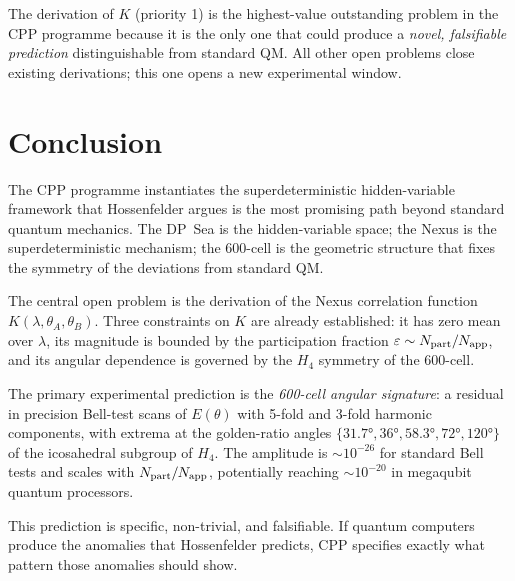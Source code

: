 \documentclass[11pt,a4paper]{article}
\newcommand{\eps}{\varepsilon}
\begin{document}
The derivation of $K$ (priority 1) is the highest-value outstanding
problem in the CPP programme because it is the only one that could
produce a \emph{novel, falsifiable prediction} distinguishable from
standard QM.  All other open problems close existing derivations;
this one opens a new experimental window.

\section{Conclusion}

The CPP programme instantiates the superdeterministic hidden-variable
framework that Hossenfelder \citep{hossenfelder2024} argues is the
most promising path beyond standard quantum mechanics.  The DP~Sea
is the hidden-variable space; the Nexus is the superdeterministic
mechanism; the 600-cell is the geometric structure that fixes the
symmetry of the deviations from standard QM.

The central open problem is the derivation of the Nexus correlation
function $K(\lambda, \theta_A, \theta_B)$.  Three constraints on $K$
are already established: it has zero mean over $\lambda$, its
magnitude is bounded by the participation fraction
$\eps \sim N_{\rm part}/N_{\rm app}$, and its angular dependence is
governed by the $H_4$ symmetry of the 600-cell.

The primary experimental prediction is the \emph{600-cell angular
signature}: a residual in precision Bell-test scans of $E(\theta)$
with 5-fold and 3-fold harmonic components, with extrema at the
golden-ratio angles $\{31.7°, 36°, 58.3°, 72°, 120°\}$ of the
icosahedral subgroup of $H_4$.  The amplitude is $\sim 10^{-26}$
for standard Bell tests and scales with $N_{\rm part}/N_{\rm app}$,
potentially reaching $\sim 10^{-20}$ in megaqubit quantum processors.

This prediction is specific, non-trivial, and falsifiable.  If
quantum computers produce the anomalies that Hossenfelder predicts,
CPP specifies exactly what pattern those anomalies should show.
\end{document}
